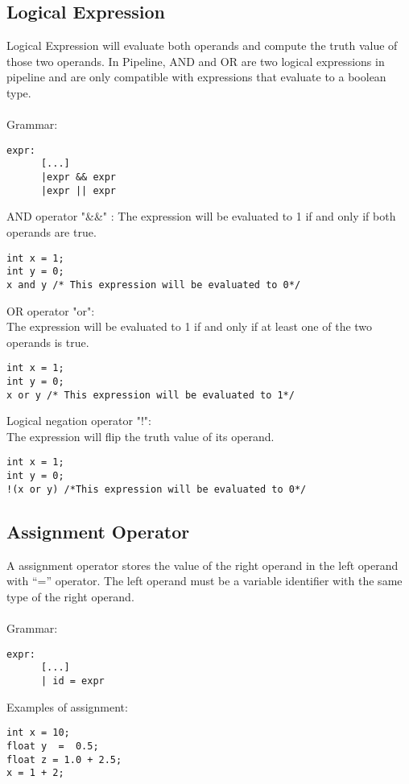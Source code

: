 \documentclass[./Report_main.tex]{subfiles}
\begin{document}
\subsection{Logical Expression}
Logical Expression will evaluate both operands and compute the truth value of those two operands. In Pipeline, AND and OR are two logical expressions in pipeline and are only compatible with expressions that evaluate to a boolean type.\\
\vspace{1 mm}\\
Grammar:
\begin{lstlisting}
expr:
  	  [...]   
      |expr && expr
      |expr || expr

\end{lstlisting}
AND operator "\&\&" :
The expression will be evaluated to 1 if and only if both operands are true.
\begin{lstlisting}
int x = 1;
int y = 0;
x and y /* This expression will be evaluated to 0*/
\end{lstlisting}
OR operator "or":\\
The expression will be evaluated to 1 if and only if at least one of the two operands is true.
\begin{lstlisting}
int x = 1;
int y = 0;
x or y /* This expression will be evaluated to 1*/
\end{lstlisting}
Logical negation operator "!":\\
The expression will flip the truth value of its operand.
\begin{lstlisting}
int x = 1;
int y = 0;
!(x or y) /*This expression will be evaluated to 0*/
\end{lstlisting}
\subsection{Assignment Operator}
A assignment operator stores the value of the right operand in the left operand with “=” operator. The left operand must be a variable identifier with the same type of the right operand.\\
\vspace{1 mm}\\
Grammar:
\begin{lstlisting}
expr:
	  [...]
      | id = expr

\end{lstlisting}
\vspace{1 mm}
Examples of assignment:
\begin{lstlisting}
int x = 10; 
float y  =  0.5;  
float z = 1.0 + 2.5;
x = 1 + 2;
\end{lstlisting}	
\end{document}
